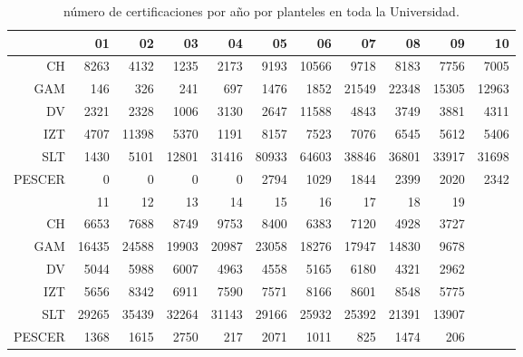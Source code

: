 \documentclass[12pt]{article}
\begin{document}
\begin{table}[ht]
\centering
\begin{tabular}{rrrrrrrrrrr}
  \hline
 & 01 & 02 & 03 & 04 & 05 & 06 & 07 & 08 & 09 & 10 \\ 
  \hline
CH & 8263 & 4132 & 1235 & 2173 & 9193 & 10566 & 9718 & 8183 & 7756 & 7005 \\ 
  GAM & 146 & 326 & 241 & 697 & 1476 & 1852 & 21549 & 22348 & 15305 & 12963  \\ 
  DV & 2321 & 2328 & 1006 & 3130 & 2647 & 11588 & 4843 & 3749 & 3881 & 4311\\ 
  IZT & 4707 & 11398 & 5370 & 1191 & 8157 & 7523 & 7076 & 6545 & 5612 & 5406\\ 
  SLT & 1430 & 5101 & 12801 & 31416 & 80933 & 64603 & 38846 & 36801 & 33917 & 31698\\ 
  PESCER &   0 &   0 &   0 &   0 & 2794 & 1029 & 1844 & 2399 & 2020 & 2342\\ 
   \hline
  \hline
 &  11 & 12 & 13 & 14 & 15 & 16 & 17 & 18 & 19 \\ 
  \hline
CH & 6653 & 7688 & 8749 & 9753 & 8400 & 6383 & 7120 & 4928 & 3727 \\ 
  GAM &  16435 & 24588 & 19903 & 20987 & 23058 & 18276 & 17947 & 14830 & 9678 \\ 
  DV &  5044 & 5988 & 6007 & 4963 & 4558 & 5165 & 6180 & 4321 & 2962 \\ 
  IZT &  5656 & 8342 & 6911 & 7590 & 7571 & 8166 & 8601 & 8548 & 5775 \\ 
  SLT &  29265 & 35439 & 32264 & 31143 & 29166 & 25932 & 25392 & 21391 & 13907 \\ 
  PESCER & 1368 & 1615 & 2750 & 217 & 2071 & 1011 & 825 & 1474 & 206 \\ 
   \hline
\end{tabular}
\caption{\label{CertificacionesAnualPlanteles}n\'umero de certificaciones por a\~no por planteles en toda la Universidad.}
\end{table}
\end{document}
